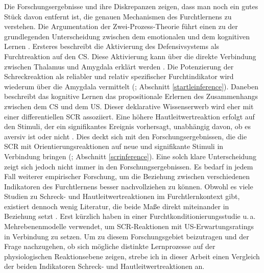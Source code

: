 		Die Forschungsergebnisse und ihre Diskrepanzen zeigen, dass man noch ein gutes Stück davon entfernt ist, die genauen Mechanismen des Furchtlernens zu verstehen. 
		Die Argumentation der Zwei-Prozess-Theorie führt einen zu der grundlegenden Unterscheidung zwischen dem emotionalen und dem kognitiven Lernen \parencite{OEHMANN2001, HAMM2005}. Ersteres beschreibt die Aktivierung des Defensivsystems als Furchtreaktion auf den CS. Diese Aktivierung kann über die direkte Verbindung zwischen Thalamus und Amygdala erklärt werden \parencite{LEDOUX2003}. Die Potenzierung der Schreckreaktion als reliabler und relativ spezifischer Furchtindikator wird wiederum über die Amygdala vermittelt (; Abschnitt \ref{startleinference}). Daneben beschreibt das kognitive Lernen das propositionale Erlernen des Zusammenhangs zwischen dem CS und dem US. Dieser deklarative Wissenserwerb wird eher mit einer differentiellen SCR assoziiert. Eine höhere Hautleitwertreaktion erfolgt auf den Stimuli, der ein signifikantes Ereignis vorhersagt, unabhängig davon, ob es aversiv ist oder nicht \parencite{HAMM1996, HAMM2005}. Dies deckt sich mit den Forschungsergebnissen, die die SCR mit Orientierungsreaktionen auf neue und signifikante Stimuli in Verbindung bringen (; Abschnitt \ref{scrinference}). 	
		Eine solch klare Unterscheidung zeigt sich jedoch nicht immer in den Forschungsergebnissen. Es bedarf in jedem Fall weiterer empirischer Forschung, um die Beziehung zwischen verschiedenen Indikatoren des Furchtlernens besser nachvollziehen zu können. Obwohl es viele Studien zu Schreck- und Hautleitwertreaktionen im Furchtlernkontext gibt, existiert dennoch wenig Literatur, die beide Maße direkt miteinander in Beziehung setzt \parencite{OJALA2020}. Erst kürzlich haben \textcite{CONSTANTINOU2021} in einer Furchtkonditionierungsstudie u.\,a. Mehrebenenmodelle verwendet, um SCR-Reaktionen mit US-Erwartungsratings in Verbindung zu setzen. %
		Um zu diesem Forschungsgebiet beizutragen und der Frage nachzugehen, ob sich mögliche distinkte Lernprozesse auf der physiologischen Reaktionsebene zeigen, strebe ich in dieser Arbeit einen Vergleich der beiden Indikatoren Schreck- und Hautleitwertreaktionen an.
		

